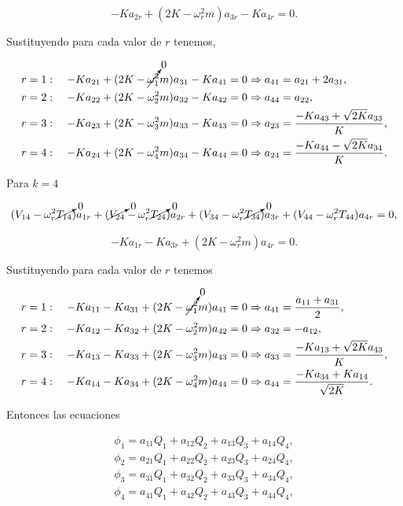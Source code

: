 \documentclass[a4paper,10pt]{article}
\numberwithin{equation}{section}
\begin{document}
\begin{equation}
 - Ka_{2r} + (2K - \omega_r^2m)a_{3r} - Ka_{4r} = 0.
\end{equation}

Sustituyendo para cada valor de $r$ tenemos,

\begin{align}
 r &= 1: \quad - Ka_{21} + (2K - \cancelto{0}{\omega_1^2}m)a_{31} - Ka_{41} = 0 \Rightarrow
 a_{41} = a_{21} + 2a_{31}, \\
 r &= 2: \quad - Ka_{22} + (2K - \omega_2^2m)a_{32} - Ka_{42} = 0 \Rightarrow
 a_{44} = a_{22}, \\
 r &= 3: \quad - Ka_{23} + (2K - \omega_3^2m)a_{33} - Ka_{43} = 0 \Rightarrow
 a_{23} = \frac{- Ka_{43} + \sqrt{2K}a_{33}}{K}, \\
 r &= 4: \quad - Ka_{24} + (2K - \omega_4^2m)a_{34} - Ka_{44} = 0 \Rightarrow
 a_{24} = \frac{- Ka_{44} - \sqrt{2K}a_{34}}{K}.
\end{align}

Para $k = 4$ 

\begin{equation}
 (V_{14} - \omega_r^2 \cancelto{0}{T_{14}})a_{1r} + (\cancelto{0}{V_{24}} - \omega_r^2 \cancelto{0}{T_{24}})a_{2r} 
  + (V_{34} - \omega_r^2 \cancelto{0}{T_{34}})a_{3r} + (V_{44} - \omega_r^2 T_{44})a_{4r} = 0,
\end{equation}

\begin{equation}
 - Ka_{1r} - Ka_{3r} + (2K - \omega_r^2m)a_{4r} = 0.
\end{equation}

Sustituyendo para cada valor de $r$ tenemos

\begin{align}
 r &= 1: \quad - Ka_{11} - Ka_{31} + (2K - \cancelto{0}{\omega_1^2}m)a_{41} = 0 \Rightarrow 
 a_{41} = \frac{a_{11} + a_{31}}{2}, \\
 r &= 2: \quad - Ka_{12} - Ka_{32} + (2K - \omega_2^2m)a_{42} = 0 \Rightarrow 
 a_{32} = - a_{12}, \\
 r &= 3: \quad - Ka_{13} - Ka_{33} + (2K - \omega_3^2m)a_{43} = 0 \Rightarrow 
 a_{33} = \frac{-Ka_{13} + \sqrt{2K}a_{43}}{K}, \\
 r &= 4: \quad - Ka_{14} - Ka_{34} + (2K - \omega_4^2m)a_{44} = 0 \Rightarrow 
 a_{44} = \frac{-K a_{34} + Ka_{14}}{\sqrt{2K}} .
\end{align}

Entonces las ecuaciones 

\begin{align}
 \phi_1 = a_{11}Q_1 + a_{12}Q_2 + a_{13}Q_3 + a_{14}Q_4, \\
 \phi_2 = a_{21}Q_1 + a_{22}Q_2 + a_{23}Q_3 + a_{24}Q_4, \\
 \phi_3 = a_{31}Q_1 + a_{32}Q_2 + a_{33}Q_3 + a_{34}Q_4, \\
 \phi_4 = a_{41}Q_1 + a_{42}Q_2 + a_{43}Q_3 + a_{44}Q_4,
\end{align}
\end{document}

